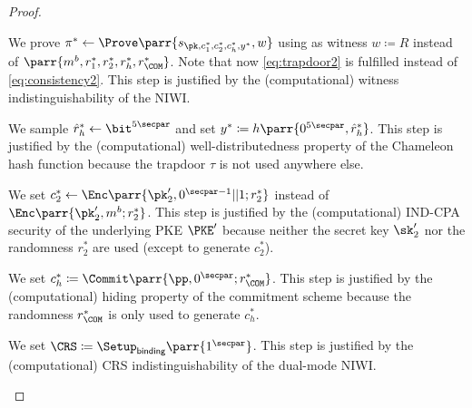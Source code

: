 \begin{proof}
\begin{hybrids}
        \item We prove \(\pi^* \gets \Prove\parr{s_{\pk,c^*_1,c^*_2,c^*_h,y^*},w}\) using as witness \(w \coloneqq R\) instead of \(\parr{m^b,r^*_1,r^*_2,r^*_h,r^*_\COM}\).
        Note that now \cref{eq:trapdoor2} is fulfilled instead of \cref{eq:consistency2}.
        This step is justified by the (computational) witness indistinguishability of the NIWI.

        \item We sample \(\hat{r}^*_h \gets \bit^{5\secpar}\) and set \(y^* \coloneqq h\parr{0^{5\secpar},\hat{r}^*_h}\).
        This step is justified by the (computational) well-distributedness property of the Chameleon hash function because the trapdoor \(\tau\) is not used anywhere else.

        \item We set \(c^*_2 \gets \Enc\parr{\pk'_2,0^{\secpar-1}||1;r^*_2}\) instead of \(\Enc\parr{\pk'_2,m^b;r^*_2}\).
        This step is justified by the (computational) IND-CPA security of the underlying PKE \(\PKE'\) because neither the secret key \(\sk'_2\) nor the randomness \(r^*_2\) are used (except to generate \(c^*_2\)).

        \item We set \(c^*_h \coloneqq \Commit\parr{\pp,0^\secpar;r^*_\COM}\).
        This step is justified by the (computational) hiding property of the commitment scheme because the randomness \(r^*_\COM\) is only used to generate \(c^*_h\).

        \item We set \(\CRS \coloneqq \Setup_{\textsf{binding}}\parr{1^\secpar}\).
        This step is justified by the (computational) CRS indistinguishability of the dual-mode NIWI.


\end{hybrids}
\end{proof}
